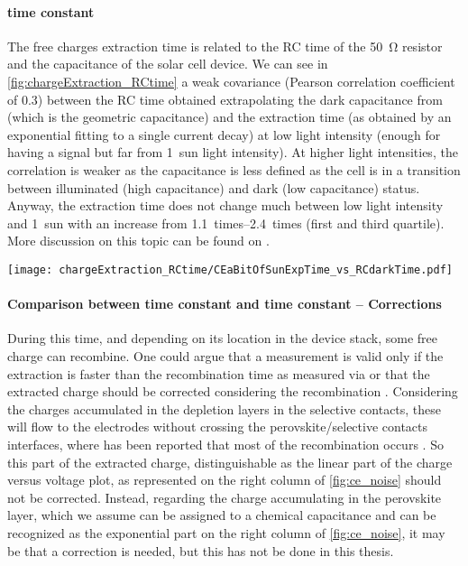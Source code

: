 \paragraph{ time constant}
The free charges extraction time is related to the RC time of the \SI{50}{\ohm} resistor and the capacitance of the solar cell device. We can see in \cref{fig:chargeExtraction_RCtime} a weak covariance (Pearson correlation coefficient of 0.3) between the RC time obtained extrapolating the dark capacitance from  (which is the geometric capacitance) and the extraction time (as obtained by an exponential fitting to a single  current decay) at low light intensity (enough for having a signal but far from 1~sun light intensity). At higher light intensities, the correlation is weaker as the capacitance is less defined as the cell is in a transition between illuminated (high capacitance) and dark (low capacitance) status. Anyway, the extraction time does not change much between low light intensity and 1~sun with an increase from \SIrange{1.1}{2.4}{times} (first and third quartile). More discussion on this topic can be found on .

\begin{SCfigure}%
	\centering
	\texttt{[image: chargeExtraction\_RCtime/CEaBitOfSunExpTime\_vs\_RCdarkTime.pdf]}
	\label{fig:chargeExtraction_RCtime}
\end{SCfigure}

\paragraph{Comparison between  time constant and  time constant -- Corrections} 
During this time, and depending on its location in the device stack, some free charge can recombine. One could argue that a  measurement is valid only if the extraction is faster than the recombination time as measured via  \cite{Ryan2017a} or that the extracted charge should be corrected considering the recombination \cite{Credgington2011}. Considering the charges accumulated in the depletion layers in the selective contacts, these will flow to the electrodes without crossing the perovskite/selective contacts interfaces, where has been reported that most of the recombination occurs \cite{Barnea-Nehoshtan2014,Stolterfoht2018a,Stolterfoht2018}. So this part of the extracted charge, distinguishable as the linear part of the charge versus voltage plot, as represented on the right column of \cref{fig:ce_noise} should not be corrected. Instead, regarding the charge accumulating in the perovskite layer, which we assume can be assigned to a chemical capacitance and can be recognized as the exponential part on the right column of \cref{fig:ce_noise}, it may be that a correction \cite{Shuttle2008a,Shuttle2008b} is needed, but this has not be done in this thesis.

